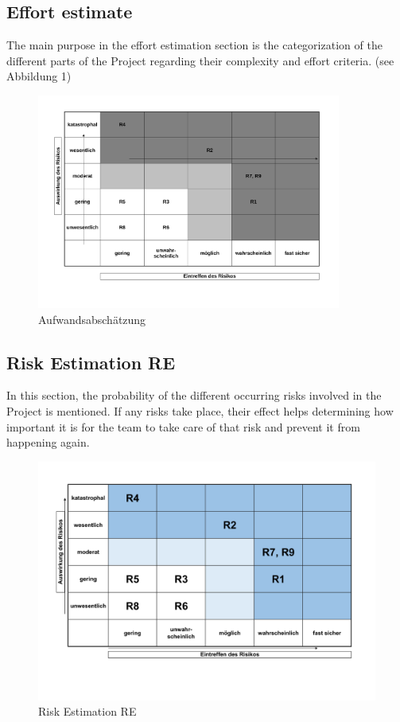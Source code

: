 \subsection{Effort estimate}
The main purpose in the effort estimation section is the categorization of the different parts of the Project regarding their complexity and effort criteria.  
 (see Abbildung 1)
\clearpage
\begin{figure}
	\begin{center}
		\includegraphics[width= 10cm]{figures/Aufwandsabschaetzung.pdf}
		\caption{Aufwandsabschätzung}
	\end{center}
\end{figure}

\subsection{Risk Estimation RE}
In this section, the probability of the different occurring risks involved in the Project is mentioned. If any risks take place, their effect helps determining how important it is for the team to take care of that risk and prevent it from happening again.

\begin{figure}
	\begin{center}
		\includegraphics[width= 17cm]{figures/Risikoabschaetzung.pdf}
		\caption{Risk Estimation RE}
	\end{center}
\end{figure}


